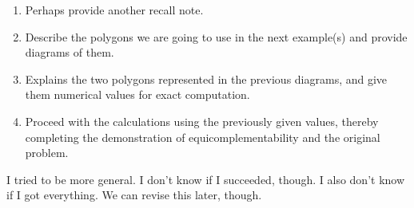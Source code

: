 \documentclass{article}
\begin{document}
\begin{enumerate}
    \item Perhaps provide another recall note.
    
    \item Describe the polygons we are going to use in the next example(s) and provide diagrams of them.
    
    \item Explains the two polygons represented in the previous diagrams, and give them numerical values for exact computation.
    
    \item Proceed with the calculations using the previously given values, thereby completing the demonstration of equicomplementability and the original problem.
    
\end{enumerate}

I tried to be more general. I don't know if I succeeded, though. I also don't know if I got everything. We can revise this later, though.
\end{document}

